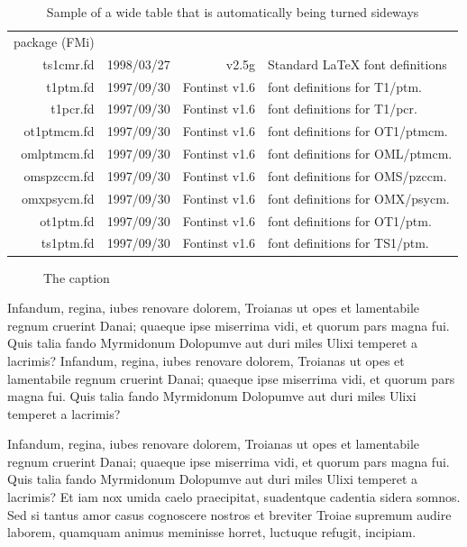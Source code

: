 \documentclass[
   \selectedoptions
  ]
  {aipproc}
\begin{document}
\begin{table}[!t]
\begin{tabular}{rrrp{}}
                                       package (FMi) \\
  ts1cmr.fd &    1998/03/27 & v2.5g  & Standard LaTeX font definitions \\
   t1ptm.fd &    1997/09/30 & Fontinst v1.6 & font definitions for
T1/ptm. \\
   t1pcr.fd &    1997/09/30 & Fontinst v1.6 & font definitions for
T1/pcr. \\
ot1ptmcm.fd &    1997/09/30 & Fontinst v1.6 & font definitions for
OT1/ptmcm. \\
omlptmcm.fd &    1997/09/30 & Fontinst v1.6 & font definitions for
OML/ptmcm. \\
omspzccm.fd &    1997/09/30 & Fontinst v1.6 & font definitions for
OMS/pzccm. \\
omxpsycm.fd &    1997/09/30 & Fontinst v1.6 & font definitions for
OMX/psycm. \\
  ot1ptm.fd &    1997/09/30 & Fontinst v1.6 & font definitions for
OT1/ptm. \\
  ts1ptm.fd &    1997/09/30 & Fontinst v1.6 & font definitions for
TS1/ptm. \\
\hline
\end{tabular}
\caption{Sample of a wide table that is automatically being turned sideways}
\label{tab:b}
\end{table}


\begin{figure}
\caption{The caption}
\end{figure}


Infandum, regina, iubes renovare dolorem, Troianas ut opes et
lamentabile regnum cruerint Danai; quaeque ipse miserrima vidi, et
quorum pars magna fui. Quis talia fando Myrmidonum Dolopumve aut duri
miles Ulixi temperet a lacrimis? 
Infandum, regina, iubes renovare dolorem, Troianas ut opes et
lamentabile regnum cruerint Danai; quaeque ipse miserrima vidi, et
quorum pars magna fui. Quis talia fando Myrmidonum Dolopumve aut duri
miles Ulixi temperet a lacrimis? 

Infandum, regina, iubes renovare dolorem, Troianas ut opes et
lamentabile regnum cruerint Danai; quaeque ipse miserrima vidi, et
quorum pars magna fui. Quis talia fando Myrmidonum Dolopumve aut duri
miles Ulixi temperet a lacrimis? Et iam nox umida caelo praecipitat,
suadentque cadentia sidera somnos. Sed si tantus amor casus
cognoscere nostros et breviter Troiae supremum audire laborem,
quamquam animus meminisse horret, luctuque refugit, incipiam.
\end{document}
